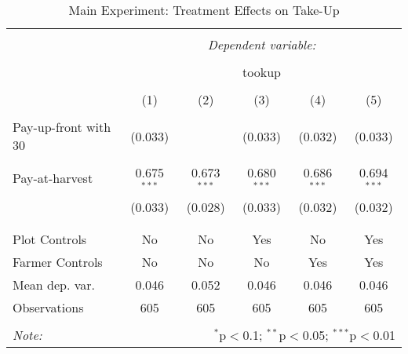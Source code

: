 
\begin{table}[!htbp] \centering 
  \caption{Main Experiment: Treatment Effects on Take-Up} 
  \label{} 
\begin{tabular}{@{\extracolsep{5pt}}lccccc} 
\\[-1.8ex]\hline 
\hline \\[-1.8ex] 
 & \multicolumn{5}{c}{\textit{Dependent variable:}} \\ 
\cline{2-6} 
\\[-1.8ex] & \multicolumn{5}{c}{tookup} \\ 
\\[-1.8ex] & (1) & (2) & (3) & (4) & (5)\\ 
\hline \\[-1.8ex] 
 Pay-up-front with 30%
  & (0.033) &  & (0.033) & (0.032) & (0.033) \\ 
  & & & & & \\ 
 Pay-at-harvest & 0.675$^{***}$ & 0.673$^{***}$ & 0.680$^{***}$ & 0.686$^{***}$ & 0.694$^{***}$ \\ 
  & (0.033) & (0.028) & (0.033) & (0.032) & (0.032) \\ 
  & & & & & \\ 
\hline \\[-1.8ex] 
Plot Controls & No & No & Yes & No & Yes \\ 
Farmer Controls & No & No & No & Yes & Yes \\ 
Mean dep. var. & 0.046 & 0.052 & 0.046 & 0.046 & 0.046 \\ 
Observations & 605 & 605 & 605 & 605 & 605 \\ 
\hline 
\hline \\[-1.8ex] 
\textit{Note:}  & \multicolumn{5}{r}{$^{*}$p$<$0.1; $^{**}$p$<$0.05; $^{***}$p$<$0.01} \\ 
\end{tabular} 
\end{table} 
